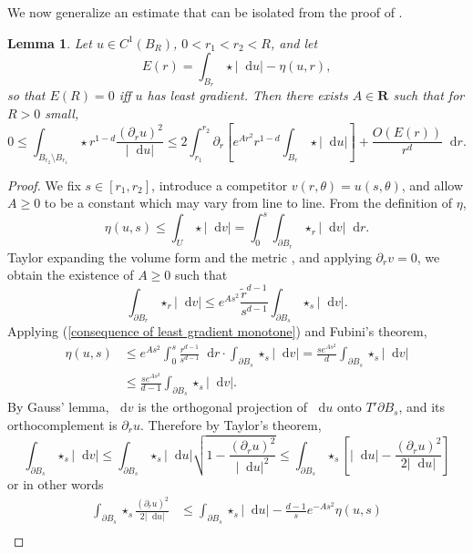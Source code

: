 \documentclass[reqno,12pt,letterpaper]{amsart}
\newcommand{\RR}{\mathbf{R}}
\newcommand*\dif{\mathop{}\!\mathrm{d}}
\newtheorem{lemma}[theorem]{Lemma}
\theoremstyle{definition}
\numberwithin{equation}{section}
\begin{document}
We now generalize an estimate that can be isolated from the proof of \cite[Lemma 5.8]{Giusti77}.

\begin{lemma}\label{monotonicity lemma}
Let $u \in C^1(B_R)$, $0 < r_1 < r_2 < R$, and let
$$E(r) = \int_{B_r} \star |\dif u| - \eta(u, r),$$
so that $E(R) = 0$ iff $u$ has least gradient. Then there exists $A \in \RR$ such that for $R > 0$ small,
\begin{equation}\label{monotonicity lemma eqn}
0 \leq \int_{B_{r_2} \setminus B_{r_1}} \star r^{1 - d}\frac{(\partial_ru)^2}{|\dif u|} \leq 2\int_{r_1}^{r_2} \partial_r \left[e^{Ar^2} r^{1-d}\int_{B_r} \star |\dif u|\right] + \frac{O(E(r))}{r^d} \dif r.
\end{equation}
\end{lemma}
\begin{proof}
We fix $s \in [r_1, r_2]$, introduce a competitor $v(r, \theta) = u(s, \theta)$, and allow $A \geq 0$ to be a constant which may vary from line to line.
From the definition of $\eta$,
\begin{equation}\label{consequence of least gradient monotone}
    \eta(u, s) \leq \int_U \star |\dif v| = \int_0^s \int_{\partial B_r} \star_r |\dif v| \dif r.
\end{equation}
Taylor expanding the volume form and the metric \cite[Lemma 3.4]{schoen1994lectures}, and applying $\partial_r v = 0$, we obtain the existence of $A \geq 0$ such that
$$\int_{\partial B_r} \star_r |\dif v| \leq e^{As^2} \frac{\tilde r^{d - 1}}{s^{d - 1}} \int_{\partial B_s} \star_s |\dif v|.$$
Applying (\ref{consequence of least gradient monotone}) and Fubini's theorem,
\begin{align*}
\eta(u, s) &\leq  e^{As^2} \int_0^s \frac{r^{d - 1}}{s^{d - 1}} \dif r \cdot \int_{\partial B_s} \star_s |\dif v| = \frac{s e^{As^2}}{d} \int_{\partial B_s} \star_s |\dif v|\\
&\leq \frac{s e^{As^2}}{d - 1} \int_{\partial B_s} \star_s |\dif v|.
\end{align*}
By Gauss' lemma, $\dif v$ is the orthogonal projection of $\dif u$ onto $T' \partial B_s$, and its orthocomplement is $\partial_r u$. Therefore by Taylor's theorem,
$$\int_{\partial B_s} \star_s |\dif v| \leq \int_{\partial B_s} \star_s |\dif u| \sqrt{1 - \frac{(\partial_r u)^2}{|\dif u|^2}} \leq \int_{\partial B_s} \star_s \left[|\dif u| - \frac{(\partial_r u)^2}{2 |\dif u|}\right]$$
or in other words
\begin{align*}
\int_{\partial B_s} \star_s \frac{(\partial_r u)^2}{2|\dif u|} &\leq \int_{\partial B_s} \star_s |\dif u| - \frac{d - 1}{s} e^{-As^2} \eta(u, s)\\

\end{align*}
\end{proof}
\end{document}
